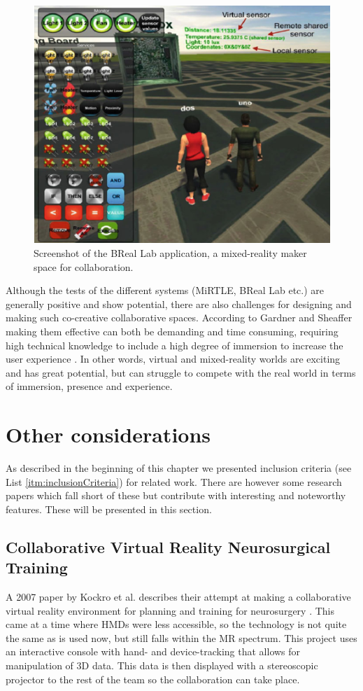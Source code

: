 \begin{figure}[!ht]
     \centering
     \includegraphics[width=.7\textwidth]{./fig/related_work/BReal.PNG}
     \captionsetup{width=0.6\linewidth}
     \caption{Screenshot of the BReal Lab application, a mixed-reality maker space for collaboration.}
     \label{fig:BReal}
 \end{figure}
 
 
 Although the tests of the different systems (MiRTLE, BReal Lab etc.) are generally positive and show  potential, there are also challenges for designing and making such co-creative collaborative spaces. According to Gardner and Sheaffer making them effective can both be demanding and time consuming, requiring high technical knowledge to include a high degree of immersion to increase the user experience \cite{gardner2017systems}. In other words, virtual and mixed-reality worlds are exciting and has great potential, but can struggle to compete with the real world in terms of immersion, presence and experience.          


\section{Other considerations}
As described in the beginning of this chapter  we presented inclusion criteria (see List \ref{itm:inclusionCriteria}) for related work. There are however some research papers which fall short of these but contribute with interesting and noteworthy features. These will be presented in this section.     

\subsection{Collaborative Virtual Reality Neurosurgical Training}
A 2007 paper by Kockro et al. describes their attempt at making a collaborative virtual reality environment for planning and training for neurosurgery \cite{kockro2007collaborative}. This came at a time where HMDs were less accessible, so the technology is not quite the same as is used now, but still falls within the MR spectrum. This project uses an interactive console with hand- and device-tracking that allows for manipulation of 3D data. This data is then displayed with a stereoscopic projector to the rest of the team so the collaboration can take place.

